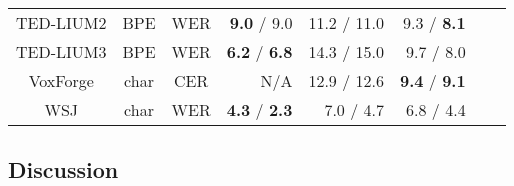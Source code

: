 \begin{table*}[tb]
{\begin{tabular}{ ccc | r | r r r r }
    TED-LIUM2    & BPE  & WER &      \textbf{9.0} / 9.0 & 11.2 / 11.0 & 9.3 / \textbf{8.1} \\
    TED-LIUM3    & BPE  & WER & \textbf{6.2} / \textbf{6.8} & 14.3 / 15.0 &  9.7 / 8.0  \\
    VoxForge    & char & CER & N/A & 12.9 / 12.6 & \textbf{9.4} / \textbf{9.1} \\
    WSJ         & char & WER & \textbf{4.3} / \textbf{2.3} & 7.0 / 4.7 & 6.8 / 4.4 \\
    \bottomrule
  \end{tabular}
  }
  \vspace{-2mm}
  \renewcommand{\arraystretch}{1.0}
\end{table*}
\begin{table}[tb]
  \caption{Comparison of the Librispeech ASR benchmark}
  \label{tab:libri_asr}
  \centering
  \vspace*{-5mm}
\end{table}

\subsection{Discussion}

